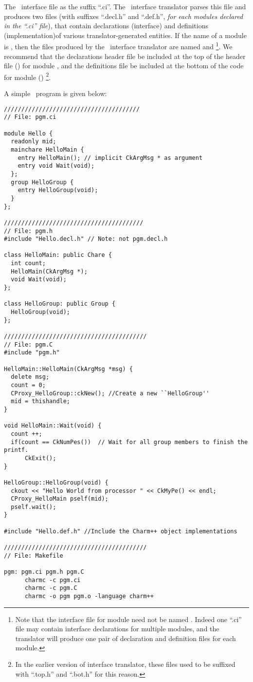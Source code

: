 The \charmpp\ interface file as the suffix ``.ci''. 
The \charmpp\ interface translator parses this file and produces two files 
(with suffixes ``.decl.h'' and ``.def.h'', {\em for each modules declared in the ``.ci'' file}), that contain declarations (interface) and definitions (implementation)of various translator-generated entities. If the name of a
module is , then the files produced by the \charmpp\ interface translator 
are named  and \footnote{Note that the interface 
file for module  need not be named . Indeed one ``.ci'' 
file may contain interface declarations for multiple modules, and the 
translator will produce one pair of declaration and definition files for each 
module.}.  We recommend that the declarations header file be included at the 
top of the header file () for module , and the definitions 
file be included at the bottom of the code for module ()
\footnote{In the earlier version of interface translator, these files used to 
be suffixed with ``.top.h'' and ``.bot.h'' for this reason.}.

A simple \charmpp\ program is given below:

\begin{verbatim}
///////////////////////////////////////
// File: pgm.ci

module Hello {
  readonly mid;
  mainchare HelloMain {
    entry HelloMain(); // implicit CkArgMsg * as argument
    entry void Wait(void);
  };
  group HelloGroup {
    entry HelloGroup(void);
  } 
};

////////////////////////////////////////
// File: pgm.h
#include "Hello.decl.h" // Note: not pgm.decl.h

class HelloMain: public Chare {
  int count;
  HelloMain(CkArgMsg *);
  void Wait(void);
};

class HelloGroup: public Group {
  HelloGroup(void);
};

/////////////////////////////////////////
// File: pgm.C
#include "pgm.h"

HelloMain::HelloMain(CkArgMsg *msg) {
  delete msg;
  count = 0;
  CProxy_HelloGroup::ckNew(); //Create a new ``HelloGroup''
  mid = thishandle;
}

void HelloMain::Wait(void) {
  count ++;
  if(count == CkNumPes())  // Wait for all group members to finish the printf.
      CkExit();	
}

HelloGroup::HelloGroup(void) {
  ckout << "Hello World from processor " << CkMyPe() << endl;
  CProxy_HelloMain pself(mid);
  pself.wait();
}

#include "Hello.def.h" //Include the Charm++ object implementations

/////////////////////////////////////////
// File: Makefile

pgm: pgm.ci pgm.h pgm.C
      charmc -c pgm.ci
      charmc -c pgm.C
      charmc -o pgm pgm.o -language charm++

\end{verbatim}

